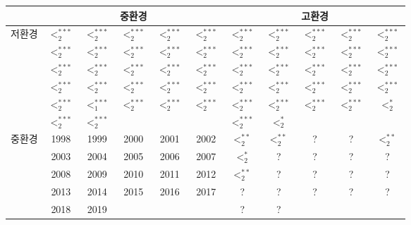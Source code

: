 \begin{tabular}{c|c|c|c|c|c|c|c|c|c|c}
\hline & \multicolumn{5}{c|}{중환경} & \multicolumn{5}{c}{고환경} \\
\hline \multirow{5}{*}{저환경} & $<_{2}^{* * *}$ & $<_{2}^{* * *}$ & $<_{2}^{* * *}$ & $<_{2}^{* * *}$ & $<_{2}^{* * *}$ & $<_{2}^{* * *}$ & $<_{2}^{* * *}$ & $<_{2}^{* * *}$ & $<_{2}^{* * *}$ & $<_{2}^{* * *}$ \\
\cline{2-11} & $<_{2}^{* * *}$ & $<_{2}^{* * *}$ & $<_{2}^{* * *}$ & $<_{2}^{* * *}$ & $<_{2}^{* * *}$ & $<_{2}^{* * *}$ & $<_{2}^{* * *}$ & $<_{2}^{* * *}$ & $<_{2}^{* * *}$ & $<_{2}^{* * *}$ \\
\cline{2-11} & $<_{2}^{* * *}$ & $<_{2}^{* * *}$ & $<_{2}^{* * *}$ & $<_{2 }^{* * *}$ & $<_{2 }^{* * *}$ & $<_{2 }^{* * *}$ & $<_{2}^{* * *}$ & $<_{2}^{* * *}$ & $<_{2}^{* * *}$ & $<_{2}^{* * *}$ \\
\cline{2-11} & $<_{2}^{* * *}$ & $<_{2}^{* * *}$ & $<_{2}^{* * *}$ & $<_{2}^{* * *}$ & $<_{2}^{* * *}$ & $<_{2}^{* * *}$ & $<_{2}^{* * *}$ & $<_{2}^{* * *}$ & $<_{2}^{* * *}$ & $<_{2}^{* * *}$ \\
\cline{2-11} & $<_{2}^{* * *}$ & $<_{1}^{* * *}$ & $<_{2}^{* * *}$ & $<_{2}^{* * *}$ & $<_{2}^{* * *}$ & $<_{2}^{* * *}$ & $<_{2}^{* * *}$ & $<_{2}^{* * *}$ & $<_{2}^{* * *}$ & $<_{2}^{*}$ \\
\cline{2-11} & $<_{2}^{* * *}$ & $<_{2}^{* * *}$ &  &  &  & $<_{2}^{* * *}$ & $<_{2}^{*}$ &  &  &  \\
\hline \multirow{5}{*}{중환경} & 1998 & 1999 & 2000 & 2001 & 2002 & $<_{2}^{* *}$ & $<_{2}^{* *}$ & ? & ? & $<_{2}^{* *}$ \\
\cline{2-11} & 2003 & 2004 & 2005 & 2006 & 2007 & $<_{2}^{*}$ & ? & ? & ? & ? \\
\cline{2-11} & 2008 & 2009 & 2010 & 2011 & 2012 & $<_{2}^{* *}$ & ? & ? & ? & ? \\
\cline{2-11} & 2013 & 2014 & 2015 & 2016 & 2017 & ? & ? & ? & ? & ? \\
\cline{2-11} & 2018 & 2019 & &  &  & ? & ? &  &  &  \\
\hline
\end{tabular}